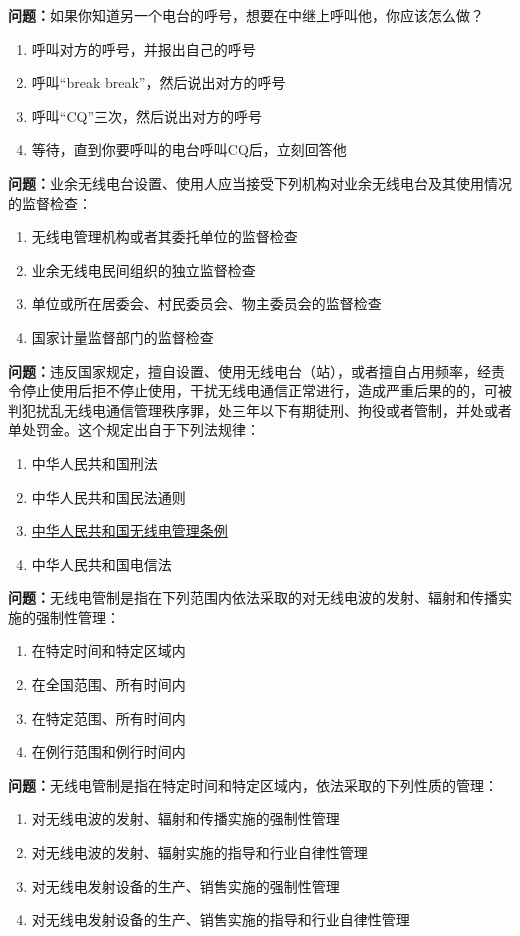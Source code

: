 \textbf{问题：}如果你知道另一个电台的呼号，想要在中继上呼叫他，你应该怎么做？
\begin{enumerate}[label=\Alph*), leftmargin=1cm]
	\item 呼叫对方的呼号，并报出自己的呼号
	\item 呼叫“break break”，然后说出对方的呼号
	\item 呼叫“CQ”三次，然后说出对方的呼号
	\item 等待，直到你要呼叫的电台呼叫CQ后，立刻回答他
\end{enumerate}

\textbf{问题：}业余无线电台设置、使用人应当接受下列机构对业余无线电台及其使用情况的监督检查：
\begin{enumerate}[label=\Alph*), leftmargin=1cm]
	\item 无线电管理机构或者其委托单位的监督检查
	\item 业余无线电民间组织的独立监督检查
	\item 单位或所在居委会、村民委员会、物主委员会的监督检查
	\item 国家计量监督部门的监督检查
\end{enumerate}

\textbf{问题：}违反国家规定，擅自设置、使用无线电台（站），或者擅自占用频率，经责令停止使用后拒不停止使用，干扰无线电通信正常进行，造成严重后果的的，可被判犯扰乱无线电通信管理秩序罪，处三年以下有期徒刑、拘役或者管制，并处或者单处罚金。这个规定出自于下列法规律：
\begin{enumerate}[label=\Alph*), leftmargin=1cm]
	\item 中华人民共和国刑法
	\item 中华人民共和国民法通则
	\item \href{http://www.gov.cn/zhengce/content/2016-11/25/content_5137687.htm}{中华人民共和国无线电管理条例}
	\item 中华人民共和国电信法
\end{enumerate}


\textbf{问题：}无线电管制是指在下列范围内依法采取的对无线电波的发射、辐射和传播实施的强制性管理：
\begin{enumerate}[label=\Alph*), leftmargin=1cm]
	\item 在特定时间和特定区域内
	\item 在全国范围、所有时间内
	\item 在特定范围、所有时间内
	\item 在例行范围和例行时间内
\end{enumerate}

\textbf{问题：}无线电管制是指在特定时间和特定区域内，依法采取的下列性质的管理：
\begin{enumerate}[label=\Alph*), leftmargin=1cm]
	\item 对无线电波的发射、辐射和传播实施的强制性管理
	\item 对无线电波的发射、辐射实施的指导和行业自律性管理
	\item 对无线电发射设备的生产、销售实施的强制性管理
	\item 对无线电发射设备的生产、销售实施的指导和行业自律性管理
\end{enumerate}

